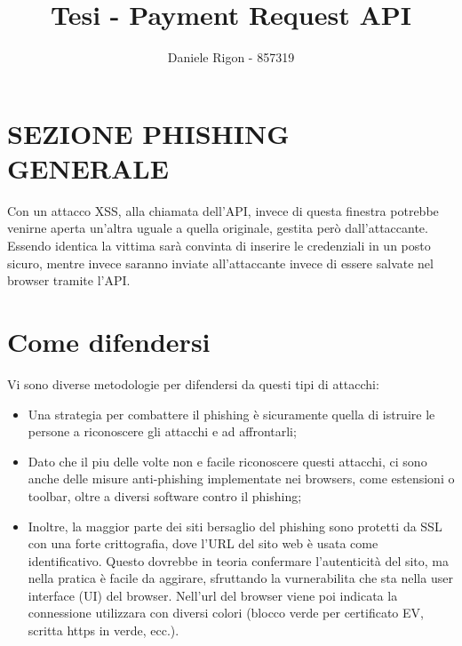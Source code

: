 \documentclass[11pt ,a4paper , twoside , openright ]{article}
\author{
	Daniele Rigon - 857319 \\
}
\begin{document}
	
	\title{Tesi - Payment Request API}
	\maketitle
	\pagebreak	
	\tableofcontents

	\newpage
	\section{SEZIONE PHISHING GENERALE}
	Con un attacco XSS, alla chiamata dell'API, invece di questa finestra potrebbe venirne aperta un'altra uguale a quella originale, gestita però dall'attaccante. Essendo identica la vittima sarà convinta di inserire le credenziali in un posto sicuro, mentre invece saranno inviate all'attaccante invece di essere salvate nel browser tramite l'API.
	
	\section{Come difendersi}
	Vi sono diverse metodologie per difendersi da questi tipi di attacchi:
	\begin{itemize}
		\item Una strategia per combattere il phishing è sicuramente quella di istruire le persone a riconoscere gli attacchi e ad affrontarli;
		\item Dato che il piu delle volte non e facile riconoscere questi attacchi, ci sono anche delle misure anti-phishing implementate nei browsers, come estensioni o toolbar, oltre a diversi software contro il phishing;
		\item Inoltre, la maggior parte dei siti bersaglio del phishing sono protetti da SSL con una forte crittografia, dove l'URL del sito web è usata come identificativo. Questo dovrebbe in teoria confermare l'autenticità del sito, ma nella pratica è facile da aggirare, sfruttando la vurnerabilita che sta nella user interface (UI) del browser. Nell'url del browser viene poi indicata la connessione utilizzara con diversi colori (blocco verde per certificato EV, scritta https in verde, ecc.).
	\end{itemize}
\end{document}
